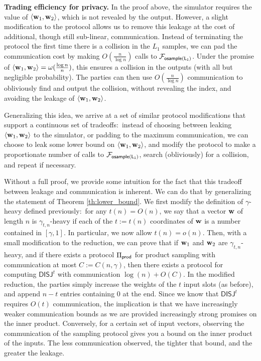\noindent \textbf{Trading efficiency for privacy.}  In the proof above, the simulator requires the value of $\langle \mathbf{w}_1, \mathbf{w}_2 \rangle$, which is not revealed by the output.  However, a slight modification to the protocol allows us to remove this leakage at the cost of additional, though still sub-linear, communication.  
Instead of terminating the protocol the first time there is a collision in the $L_1$ samples, we can pad the communication cost by making $O(\frac{n}{\log n})$ 
calls to $\mathcal{F}_{{\mathsf{osample(L_1)}}}$.  Under the promise of $\langle \mathbf{w}_1, \mathbf{w}_2 \rangle = \omega(\frac{\log n}{n})$, this ensures a collision in 
the outputs (with all but negligible probability).  The parties can then use $O(\frac{n}{\log n})$ communication to obliviously find and output the collision, without revealing the index, and avoiding the leakage of $\langle \mathbf{w}_1, \mathbf{w}_2 \rangle$.  

Generalizing this idea, we arrive at a set of similar protocol modifications that support a continuous set of tradeoffs:~instead of choosing between  leaking $\langle \mathbf{w}_1, \mathbf{w}_2 \rangle$ to the simulator, or padding to the maximum communication, we 
can choose to leak some lower bound on $\langle \mathbf{w}_1, \mathbf{w}_2 \rangle$, and modify the protocol to make a proportionate number of calls to $\mathcal{F}_{{\mathsf{osample(L_1)}}}$, search (obliviously) for a collision, and repeat if necessary.  

Without a full proof, we provide some intuition for the fact that this tradeoff between leakage and communication is inherent.  We can do that by generalizing the statement of Theorem \ref{th:lower_bound}.  We first modify the definition of $\gamma$-heavy defined previously:~for any $t(n) = O(n)$, we say that a vector $\mathbf{w}$ of length $n$ is $\gamma_{t,n}$-heavy if each of the $t := t(n)$ coordinates of $\mathbf{w}$ is a number contained in $[\gamma, 1]$. 
In particular, we now allow $t(n) = o(n)$.  Then, with a small modification to the reduction, we can prove that if $\mathbf{w}_1$ and $\mathbf{w}_2$ are $\gamma_{t,n}$-heavy, and if there exists a protocol $\Pi_{\mathsf{prod}}$ for product sampling with communication at most $C := C(n, \gamma)$, then there exists a protocol for computing $\mathsf{DISJ}^t$ with communication $\log(n) + O(C)$.  In the modified reduction, the parties simply increase the weights of the $t$ input slots (as before), and append $n-t$ entries containing 0 at the end.  
Since we know that $\mathsf{DISJ}^t$ requires $O(t)$ communication, the implication is that we have increasingly weaker communication bounds as we are provided increasingly strong promises on the inner product.  
Conversely, for a certain set of input vectors, observing the communication of the sampling protocol gives you a bound on the inner product of the inputs.  The less communication observed, the tighter that bound, and the greater the leakage.  






